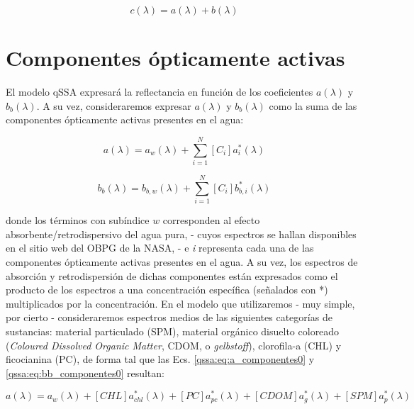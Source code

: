 \begin{equation}
    c(\lambda) = a(\lambda) + b(\lambda)
    \label{qssa:eq:c}
\end{equation}

\section{Componentes ópticamente activas}
\label{qssa:s:componentes}
    
    El modelo qSSA expresará la reflectancia en función de los coeficientes $a(\lambda)$ y $b_{b}(\lambda)$. A su vez, consideraremos expresar $a(\lambda)$ y $b_{b}(\lambda)$ como la suma de las componentes ópticamente activas presentes en el agua:
    
    \begin{equation}
        a(\lambda) = a_{w}(\lambda) + \sum_{i=1}^{N} [C_{i}]a_{i}^{*}(\lambda)
        \label{qssa:eq:a_componentes0}
    \end{equation}
    
    \begin{equation}
        b_{b}(\lambda) = b_{b,w}(\lambda) + \sum_{i=1}^{N} [C_{i}]b_{b,i}^{*}(\lambda)
        \label{qssa:eq:bb_componentes0}
    \end{equation}

    \noindent donde los términos con subíndice $w$ corresponden al efecto absorbente/retrodispersivo del agua pura, \cite{kou1993}\cite{pope1997}\cite{smith1981} - cuyos espectros se hallan disponibles en el sitio web del OBPG de la NASA, \cite{obpg} - e \textit{i} representa cada una de las componentes ópticamente activas presentes en el agua. A su vez, los espectros de absorción y retrodispersión de dichas componentes están expresados como el producto de los espectros a una concentración específica (señalados con *) multiplicados por la concentración. En el modelo que utilizaremos - muy simple, por cierto - consideraremos espectros medios de las siguientes categorías de sustancias: material particulado (SPM), material orgánico disuelto coloreado (\textit{Coloured Dissolved Organic Matter}, CDOM, o \textit{gelbstoff}), clorofila-a (CHL) y ficocianina (PC), de forma tal que las Ecs. \ref{qssa:eq:a_componentes0} y \ref{qssa:eq:bb_componentes0} resultan:

    \begin{equation}
        a(\lambda) =
        a_{w}(\lambda) + 
        [CHL]a_{chl}^{*}(\lambda) + 
        [PC]a_{pc}^{*}(\lambda) + 
        [CDOM]a_{g}^{*}(\lambda) + 
        [SPM]a_{p}^{*}(\lambda)
        \label{qssa:eq:a_componentes}
    \end{equation}
    

